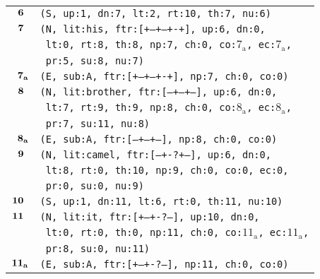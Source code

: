 \documentclass{article}
\begin{document}
\begin{minipage}{\textwidth}
{\begin{tabular}{|r|l|}
    ${\textbf{\textrm{6}}_{\phantom{z}}}$ & \texttt{\texttt{(S,~up:1,~dn:7,~lt:2,~rt:10,~th:7,~nu:6)}} \\
    ${\textbf{\textrm{7}}_{\phantom{z}}}$ & \texttt{\texttt{(N,~lit:his,~ftr:[+--+--+-+],~up:6,~dn:0,}} \\
    & \texttt{\texttt{~lt:0,~rt:8,~th:8,~np:7,~ch:0,~co:${\textrm{7}_{\textrm{a}}}$,~ec:${\textrm{7}_{\textrm{a}}}$,}} \\
    & \texttt{\texttt{~pr:5,~su:8,~nu:7)}} \\
    ${\textbf{\textrm{7}}_{\textbf{\textrm{a}}}}$ & \texttt{\texttt{(E,~sub:A,~ftr:[+--+--+-+],~np:7,~ch:0,~co:0)}} \\
    ${\textbf{\textrm{8}}_{\phantom{z}}}$ & \texttt{\texttt{(N,~lit:brother,~ftr:[---+--+--],~up:6,~dn:0,}} \\
    & \texttt{\texttt{~lt:7,~rt:9,~th:9,~np:8,~ch:0,~co:${\textrm{8}_{\textrm{a}}}$,~ec:${\textrm{8}_{\textrm{a}}}$,}} \\
    & \texttt{\texttt{~pr:7,~su:11,~nu:8)}} \\
    ${\textbf{\textrm{8}}_{\textbf{\textrm{a}}}}$ & \texttt{\texttt{(E,~sub:A,~ftr:[---+--+--],~np:8,~ch:0,~co:0)}} \\
    ${\textbf{\textrm{9}}_{\phantom{z}}}$ & \texttt{\texttt{(N,~lit:camel,~ftr:[---+-?+--],~up:6,~dn:0,}} \\
    & \texttt{\texttt{~lt:8,~rt:0,~th:10,~np:9,~ch:0,~co:0,~ec:0,}} \\
    & \texttt{\texttt{~pr:0,~su:0,~nu:9)}} \\
    ${\textbf{\textrm{10}}_{\phantom{z}}}$ & \texttt{\texttt{(S,~up:1,~dn:11,~lt:6,~rt:0,~th:11,~nu:10)}} \\
    ${\textbf{\textrm{11}}_{\phantom{z}}}$ & \texttt{\texttt{(N,~lit:it,~ftr:[+--+-?---],~up:10,~dn:0,}} \\
    & \texttt{\texttt{~lt:0,~rt:0,~th:0,~np:11,~ch:0,~co:${\textrm{11}_{\textrm{a}}}$,~ec:${\textrm{11}_{\textrm{a}}}$,}} \\
    & \texttt{\texttt{~pr:8,~su:0,~nu:11)}} \\
    ${\textbf{\textrm{11}}_{\textbf{\textrm{a}}}}$ & \texttt{\texttt{(E,~sub:A,~ftr:[+--+-?---],~np:11,~ch:0,~co:0)}} \\
    \hline
  \end{tabular}
  }
\end{minipage}
\bigbreak
\end{document}
